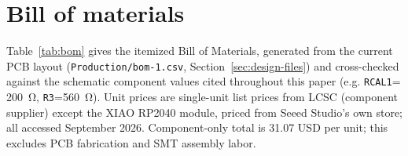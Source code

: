 \section{Bill of materials}
\label{sec:bom}

Table~\ref{tab:bom} gives the itemized Bill of Materials, generated from
the current PCB layout (\texttt{Production/bom-1.csv},
Section~\ref{sec:design-files}) and cross-checked against the schematic
component values cited throughout this paper (e.g. \texttt{RCAL1}=
\SI{200}{\ohm}, \texttt{R3}=\SI{560}{\ohm}). Unit prices are single-unit
list prices from LCSC (component supplier) except the XIAO RP2040 module,
priced from Seeed Studio's own store; all accessed September 2026.
Component-only total is \SI{31.07}{} USD per unit; this excludes PCB
fabrication and SMT assembly labor.

